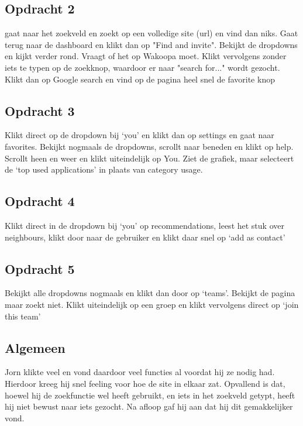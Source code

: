 \subsection{Opdracht 2}
gaat naar het zoekveld en zoekt op een volledige site (url) en vind dan niks. Gaat terug naar de dashboard en klikt dan op "Find and invite". Bekijkt de dropdowns en kijkt verder rond. Vraagt of het op Wakoopa moet. Klikt vervolgens zonder iets te typen op de zoekknop, waardoor er naar "search for..." wordt gezocht. Klikt dan op Google search en vind op de pagina heel snel de favorite knop

\subsection{Opdracht 3}
Klikt direct op de dropdown bij `you' en klikt dan op settings en gaat naar favorites. Bekijkt nogmaals de dropdowns, scrollt naar beneden en klikt op help. Scrollt heen en weer en klikt uiteindelijk op You. Ziet de grafiek, maar selecteert de `top used applications' in plaats van category usage.

\subsection{Opdracht 4}
Klikt direct in de dropdown bij `you' op recommendations, leest het stuk over neighbours, klikt door naar de gebruiker en klikt daar snel op `add as contact'

\subsection{Opdracht 5}
Bekijkt alle dropdowns nogmaals en klikt dan door op `teams'. Bekijkt de pagina maar zoekt niet. Klikt uiteindelijk op een groep en klikt vervolgens direct op `join this team'

\subsection{Algemeen}
Jorn klikte veel en vond daardoor veel functies al voordat hij ze nodig had. Hierdoor kreeg hij snel feeling voor hoe de site in elkaar zat. Opvallend is dat, hoewel hij de zoekfunctie wel heeft gebruikt, en iets in het zoekveld getypt, heeft hij niet bewust naar iets gezocht. Na afloop gaf hij aan dat hij dit gemakkelijker vond.

